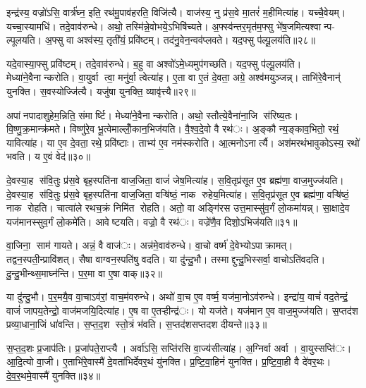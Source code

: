 इन्द्र॑स्य॒ वज्रो॑ऽसि॒ वार्त्र॑घ्न॒ इति॒ रथ॑मु॒पाव॑हरति॒ विजि॑त्यै। वाज॑स्य॒ नु प्र॑स॒वे मा॒तरं॑ म॒हीमित्या॑ह। यच्चै॒वेयम्। यच्चा॒स्यामधि॑। तदे॒वाव॑रुन्धे। अथो॒ तस्मि॑न्ने॒वोभये॒ऽभिषि॑च्यते। अ॒फ्स्व॑न्तर॒मृत॑म॒फ्सु भे॑ष॒जमित्यश्वान्प- ल्पूलयति। अ॒फ्सु वा अश्व॑स्य॒ तृती॑यं॒ प्रवि॑ष्टम्। तद॑नु॒वेन॒न्वव॑प्लवते। यद॒फ्सु प॑ल्पू॒लय॑ति॥२८॥

यदे॒वास्या॒फ्सु प्रवि॑ष्टम्। तदे॒वाव॑रुन्धे। ब॒हु वा अश्वो॑ऽमे॒ध्यमुप॑गच्छति। यद॒फ्सु प॑ल्पू॒लय॑ति। मेध्या॑ने॒वैनान्करोति। वा॒युर्वा त्वा॒ मनु॑र्वा॒ त्वेत्या॑ह। ए॒ता वा ए॒तं दे॒वता॒ अग्रे॒ अश्व॑मयुञ्जन्न्। ताभि॑रे॒वैनान्॑ युनक्ति। स॒वस्योज्जि॑त्यै। यजु॑षा युनक्ति॒ व्यावृ॑त्त्यै॥२९॥

अपांनपादाशुहेम॒न्निति॒ संमार्ष्टि। मेध्या॑ने॒वैनान्करोति। अथो॒ स्तौत्ये॒वैना॑ना॒जि स॑रिष्य॒तः। वि॒ष्णु॒क्र॒मान्क्र॑मते। विष्णु॑रे॒व भू॒त्वेमाल्लोँ॒कान॒भिज॑यति। वै॒श्व॒दे॒वो वै रथ॑ः। अ॒ङ्कौ न्य॒ङ्काव॒भितो॒ रथं॒ यावित्या॑ह। या ए॒व दे॒वता॒ रथे॒ प्रवि॑ष्टाः। ताभ्य॑ ए॒व नम॑स्करोति। आ॒त्मनोऽनार्त्यै। अश॑मरथंभावुकोऽस्य॒ रथो॑ भवति। य ए॒वं वेद॑॥३०॥


दे॒वस्या॒ह स॑वि॒तुः प्र॑स॒वे बृह॒स्पति॑ना वाज॒जिता॒ वाजं॑ जेष॒मित्या॑ह। स॒वि॒तृप्र॑सूत ए॒व ब्रह्म॑णा॒ वाज॒मुज्ज॑यति। दे॒वस्या॒ह स॑वि॒तुः प्र॑स॒वे बृह॒स्पति॑ना वाज॒जिता॒ वऱ्षि॑ष्ठं॒ नाक रुहेय॒मित्या॑ह। स॒वि॒तृप्र॑सूत ए॒व ब्रह्म॑णा॒ वऱ्षि॑ष्ठं॒ नाक रोहति। चात्वा॑ले रथच॒क्रं निमि॑त रोहति। अतो॒ वा अङ्गि॑रस उत्त॒मास्सु॑व॒र्गं लो॒कमा॑यन्न्। सा॒क्षादे॒व यज॑मानस्सुव॒र्गं लो॒कमे॑ति। आवेष्टयति। वज्रो॒ वै रथ॑ः। वज्रे॑णै॒व दिशो॒ऽभिज॑यति॥३१॥

वा॒जिना॒ साम॑ गायते। अन्नं॒ वै वाज॑ः। अन्न॑मे॒वाव॑रुन्धे। वा॒चो वर्ष्म॑ दे॒वेभ्योऽपाक्रामत्। तद्वन॒स्पती॒न्प्रावि॑शत्। सैषा वाग्वन॒स्पति॑षु वदति। या दु॑न्दु॒भौ। तस्माद्दुन्दु॒भिस्सर्वा॒ वाचोऽति॑वदति। दु॒न्दु॒भीन्थ्स॒माघ्न॑न्ति। प॒र॒मा वा ए॒षा वाक्॥३२॥

या दु॑न्दु॒भौ। प॒र॒मयै॒व वा॒चाऽव॑रां॒ वाच॒म॑वरुन्धे। अथो॑ वा॒च ए॒व वर्ष्म॒ यज॑मा॒नोऽव॑रुन्धे। इन्द्रा॑य॒ वाचं॑ वद॒तेन्द्रं॒ वाजं॑ जापय॒तेन्द्रो॒ वाज॑मजयि॒दित्या॑ह। ए॒ष वा ए॒तऱ्हीन्द्र॑ः। यो यज॑ते। यज॑मान ए॒व वाज॒मुज्ज॑यति। स॒प्तद॑श प्रव्या॒धाना॒जिं धा॑वन्ति। स॒प्त॒द॒श स्तो॒त्रं भ॑वति। स॒प्तद॑शसप्तदश दीयन्ते॥३३॥

स॒प्त॒द॒शः प्र॒जाप॑तिः। प्र॒जा॑पते॒राप्त्यै। अर्वा॑ऽसि॒ सप्ति॑रसि वा॒ज्य॑सीत्या॑ह। अ॒ग्निर्वा अर्वा। वा॒युस्सप्ति॑ः। आ॒दि॒त्यो वा॒जी। ए॒ताभि॑रे॒वास्मै॑ दे॒वता॑भिर्देवर॒थं यु॑नक्ति। प्र॒ष्टि॒वा॒हिनं॑ युनक्ति। प्र॒ष्टि॒वा॒ही वै दे॑वर॒थः। दे॒व॒र॒थमे॒वास्मै॑ युनक्ति॥३४॥

